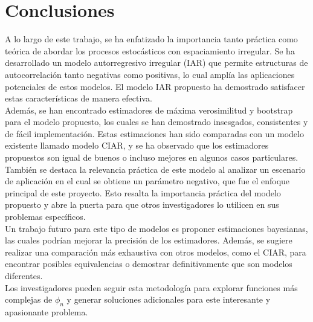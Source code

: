 \chapter{Conclusiones}

A lo largo de este trabajo, se ha enfatizado la importancia tanto práctica como teórica de abordar los procesos estocásticos con espaciamiento irregular. Se ha desarrollado un modelo autorregresivo irregular (IAR) que permite estructuras de autocorrelación tanto negativas como positivas, lo cual amplía las aplicaciones potenciales de estos modelos. El modelo IAR propuesto ha demostrado satisfacer estas características de manera efectiva. \\

Además, se han encontrado estimadores de máxima verosimilitud y bootstrap para el modelo propuesto, los cuales se han demostrado insesgados, consistentes y de fácil implementación. Estas estimaciones han sido comparadas con un modelo existente llamado modelo CIAR, y se ha observado que los estimadores propuestos son igual de buenos o incluso mejores en algunos casos particulares. \\

También se destaca la relevancia práctica de este modelo al analizar un escenario de aplicación en el cual se obtiene un parámetro negativo, que fue el enfoque principal de este proyecto. Esto resalta la importancia práctica del modelo propuesto y abre la puerta para que otros investigadores lo utilicen en sus problemas específicos.\\

Un trabajo futuro para este tipo de modelos es proponer estimaciones bayesianas, las cuales podrían mejorar la precisión de los estimadores. Además, se sugiere realizar una comparación más exhaustiva con otros modelos, como el CIAR, para encontrar posibles equivalencias o demostrar definitivamente que son modelos diferentes.\\

Los investigadores pueden seguir esta metodología para explorar funciones más complejas de $\phi_n$ y generar soluciones adicionales para este interesante y apasionante problema.